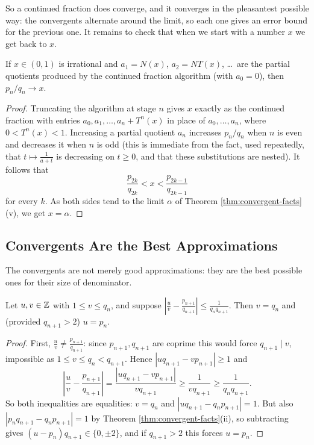 \documentclass[a4paper]{scrartcl}
\begin{document}
So a continued fraction does converge, and it converges in the pleasantest possible way: the convergents alternate around the limit, so each one gives an error bound for the previous one. It remains to check that when we start with a number $x$ we get back to $x$.

\begin{lemma}\label{lem:cf-value}
	If $x\in(0,1)$ is irrational and $a_1 = N(x)$, $a_2 = NT(x)$, \ldots\ are the partial quotients produced by the continued fraction algorithm (with $a_0 = 0$), then $p_n/q_n\to x$.
\end{lemma}

\begin{proof}
	Truncating the algorithm at stage $n$ gives $x$ exactly as the continued fraction with entries $a_0,a_1,\ldots,a_n+T^{n}(x)$ in place of $a_0,\ldots,a_n$, where $0<T^n(x)<1$. Increasing a partial quotient $a_n$ increases $p_n/q_n$ when $n$ is even and decreases it when $n$ is odd (this is immediate from the fact, used repeatedly, that $t\mapsto\frac{1}{a+t}$ is decreasing on $t\geq0$, and that these substitutions are nested). It follows that
	$$\frac{p_{2k}}{q_{2k}} < x < \frac{p_{2k-1}}{q_{2k-1}}$$
	for every $k$. As both sides tend to the limit $\alpha$ of Theorem \ref{thm:convergent-facts}(v), we get $x=\alpha$.
\end{proof}

\subsection{Convergents Are the Best Approximations}

The convergents are not merely good approximations: they are the best possible ones for their size of denominator.

\begin{lemma}\label{lem:cf-best-lemma}
	Let $u,v\in\mathbb{Z}$ with $1\leq v\leq q_n$, and suppose $\left|\frac uv - \frac{p_{n+1}}{q_{n+1}}\right|\leq\frac{1}{q_nq_{n+1}}$. Then $v=q_n$ and (provided $q_{n+1}>2$) $u = p_n$.
\end{lemma}

\begin{proof}
	First, $\frac uv \neq \frac{p_{n+1}}{q_{n+1}}$: since $p_{n+1},q_{n+1}$ are coprime this would force $q_{n+1}\mid v$, impossible as $1\leq v\leq q_n<q_{n+1}$. Hence $|uq_{n+1}-vp_{n+1}|\geq1$ and
	$$\left|\frac uv-\frac{p_{n+1}}{q_{n+1}}\right| = \frac{|uq_{n+1}-vp_{n+1}|}{vq_{n+1}} \geq \frac{1}{vq_{n+1}}\geq\frac{1}{q_nq_{n+1}}.$$
	So both inequalities are equalities: $v = q_n$ and $|uq_{n+1}-q_np_{n+1}|=1$. But also $|p_nq_{n+1}-q_np_{n+1}|=1$ by Theorem \ref{thm:convergent-facts}(ii), so subtracting gives $(u-p_n)q_{n+1}\in\{0,\pm2\}$, and if $q_{n+1}>2$ this forces $u = p_n$.
\end{proof}
\end{document}
